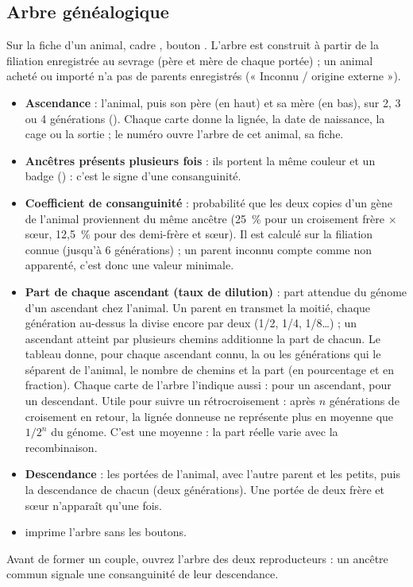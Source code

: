 \documentclass[11pt,a4paper]{article}
\begin{document}
\subsection{Arbre généalogique}\label{sec:arbre}
Sur la fiche d'un animal, cadre , bouton . L'arbre est construit à partir de la filiation enregistrée au
sevrage (père et mère de chaque portée) ; un animal acheté ou importé n'a pas
de parents enregistrés (« Inconnu / origine externe »).
\begin{itemize}
  \item \textbf{Ascendance} : l'animal, puis son père (en haut) et sa mère
    (en bas), sur 2, 3 ou 4 générations (). Chaque carte
    donne la lignée, la date de naissance, la cage ou la sortie ; le numéro
    ouvre l'arbre de cet animal,  sa fiche.
  \item \textbf{Ancêtres présents plusieurs fois} : ils portent la même
    couleur et un badge () : c'est le signe d'une consanguinité.
  \item \textbf{Coefficient de consanguinité} : probabilité que les deux
    copies d'un gène de l'animal proviennent du même ancêtre (25~\% pour un
    croisement frère × sœur, 12,5~\% pour des demi-frère et sœur). Il est
    calculé sur la filiation connue (jusqu'à 6 générations) ; un parent
    inconnu compte comme non apparenté, c'est donc une valeur minimale.
  \item \textbf{Part de chaque ascendant (taux de dilution)} : part
    attendue du génome d'un ascendant chez l'animal. Un parent en transmet
    la moitié, chaque génération au-dessus la divise encore par deux (1/2,
    1/4, 1/8…) ; un ascendant atteint par plusieurs chemins additionne la
    part de chacun. Le tableau donne, pour chaque ascendant connu, la ou les
    générations qui le séparent de l'animal, le nombre de chemins et la part
    (en pourcentage et en fraction). Chaque carte de l'arbre l'indique aussi :
     pour un ascendant,  pour un descendant.
    Utile pour suivre un rétrocroisement : après $n$ générations de
    croisement en retour, la lignée donneuse ne représente plus en moyenne
    que $1/2^n$ du génome. C'est une moyenne : la part réelle varie avec la
    recombinaison.
  \item \textbf{Descendance} : les portées de l'animal, avec l'autre parent
    et les petits, puis la descendance de chacun (deux générations). Une
    portée de deux frère et sœur n'apparaît qu'une fois.
  \item {} imprime l'arbre sans les boutons.
\end{itemize}
\begin{regle}
Avant de former un couple, ouvrez l'arbre des deux reproducteurs : un ancêtre
commun signale une consanguinité de leur descendance.
\end{regle}
\end{document}
